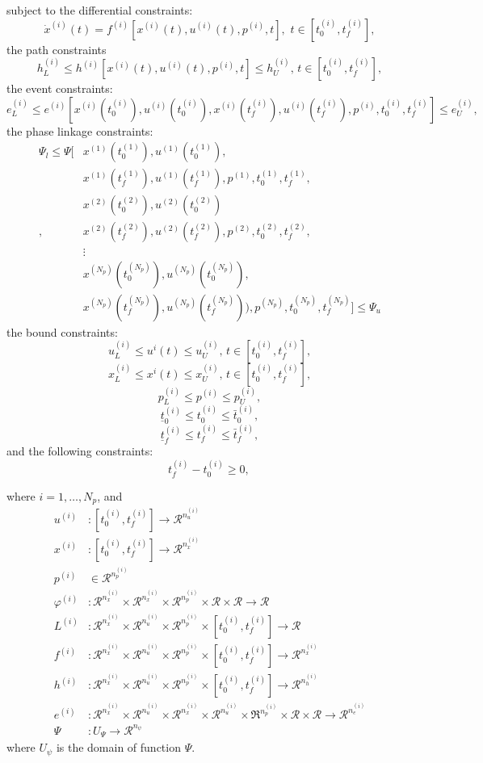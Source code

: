 \documentclass[a4paper,11pt]{report}    %
\newcommand{\RE}{\mathcal{R}}
\begin{document}
\noindent subject to the differential constraints:
\[
 \dot x^{(i)}(t) = f^{(i)}[ x^{(i)}(t),u^{(i)}(t),p^{(i)},t ], \, \,t\in[t_0^{(i)},t_f^{(i)}],
\]
the path constraints
\[
 h_L^{(i)} \le h^{(i)}[ x^{(i)}(t),u^{(i)}(t),p^{(i)},t ] \le h_U^{(i)},  \,t\in[t_0^{(i)},t_f^{(i)}],
\]
the event constraints:
\[
 e_L^{(i)} \le e^{(i)}[ x^{(i)}(t_0^{(i)}),u^{(i)}(t_0^{(i)}),x^{(i)}(t_f^{(i)}),u^{(i)}(t_f^{(i)}),p^{(i)},t_0^{(i)}, t_f^{(i)} ] \le e_U^{(i)}, 
\]
the phase linkage constraints:
\[
\begin{aligned}
  \Psi_l \le \Psi[ & x^{(1)}(t_0^{(1)}),u^{(1)}(t_0^{(1)}),  \\ 
        & x^{(1)}(t_f^{(1)}),u^{(1)}(t_f^{(1)}), p^{(1)}, t_0^{(1)}, t_f^{(1)}, \\
        & x^{(2)}(t_0^{(2)}),u^{(2)}(t_0^{(2)})  \\, 
        & x^{(2)}(t_f^{(2)}),u^{(2)}(t_f^{(2)}), p^{(2)}, t_0^{(2)}, t_f^{(2)}, \\
        &   \vdots \\
   & x^{(N_p)}(t_0^{(N_p)}),u^{(N_p)}(t_0^{(N_p)}), \\
   &  x^{(N_p)}(t_f^{(N_p)}),u^{(N_p)}(t_f^{(N_p)})),    p^{(N_p)}, t_0^{(N_p)}, t_f^{(N_p)}      ] \le \Psi_u
\end{aligned}
\]
the bound constraints:
\[
    u_L^{(i)} \le u^{i}(t) \le u_U^{(i)}, \, t\in[t_0^{(i)},t_f^{(i)}],  
\]
\[
    x_L^{(i)} \le x^{i}(t) \le x_U^{(i)}, \, t\in[t_0^{(i)},t_f^{(i)}], 
\]
\[
    p_L^{(i)} \le p^{(i)} \le p_U^{(i)}, 
\]
\[
    \underline{t}_0^{(i)} \le t_0^{(i)} \le \bar{t}_0^{(i)},
\]
\[
    \underline{t}_f^{(i)} \le t_f^{(i)} \le \bar{t}_f^{(i)}, 
\]
and the following constraints:
\[
    t_f^{(i)} - t_0^{(i)} \ge 0, \, 
\]


\noindent where $i=1,\ldots,N_p$, and
\begin{equation}
\begin{aligned}
  u^{(i)}&: [t_0^{(i)}, t_f^{(i)}] \rightarrow \RE^{n_u^{(i)}} \\
  x^{(i)}&: [t_0^{(i)}, t_f^{(i)}] \rightarrow \RE^{n_x^{(i)}} \\
  p^{(i)} &\in \RE^{n_p^{(i)}} \\
  \varphi^{(i)}&: \RE^{n_x^{(i)}} \times \RE^{n_x^{(i)}} \times \RE^{n_p^{(i)}} \times \RE \times \RE \rightarrow \RE \\
  L^{(i)}&: \RE^{n_x^{(i)}} \times \RE^{n_u^{(i)}} \times \RE^{n_p^{(i)}} \times [t_0^{(i)},t_f^{(i)}] \rightarrow \RE  \\
  f^{(i)}&: \RE^{n_x^{(i)}} \times \RE^{n_u^{(i)}} \times \RE^{n_p^{(i)}} \times [t_0^{(i)},t_f^{(i)}] \rightarrow \RE^{n_x^{(i)}}  \\
  h^{(i)}&: \RE^{n_x^{(i)}} \times \RE^{n_u^{(i)}} \times \RE^{n_p^{(i)}} \times [t_0^{(i)},t_f^{(i)}] \rightarrow \RE^{n_h^{(i)}}  \\
  e^{(i)}&: \RE^{n_x^{(i)}} \times \RE^{n_u^{(i)}} \times \RE^{n_x^{(i)}} \times \RE^{n_u^{(i)}} \times \Re^{n_p^{(i)}} \times \RE \times \RE  \rightarrow \RE^{n_e^{(i)}}  \\
  \Psi&: U_\Psi \rightarrow \RE^{n_\psi}
\end{aligned}
\end{equation}
where $U_\psi$ is the domain of function $\Psi$.
\end{document}
